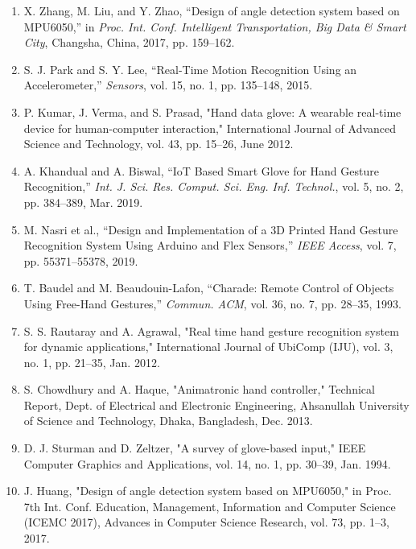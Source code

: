 \begin{enumerate}
  \item X. Zhang, M. Liu, and Y. Zhao, “Design of angle detection system based on MPU6050,” in \textit{Proc. Int. Conf. Intelligent Transportation, Big Data \& Smart City}, Changsha, China, 2017, pp. 159–162.
  \item S. J. Park and S. Y. Lee, “Real-Time Motion Recognition Using an Accelerometer,” \textit{Sensors}, vol. 15, no. 1, pp. 135–148, 2015.
  \item P. Kumar, J. Verma, and S. Prasad, "Hand data glove: A wearable real-time device for human-computer interaction," International Journal of Advanced Science and Technology, vol. 43, pp. 15–26, June 2012. 
  \item A. Khandual and A. Biswal, “IoT Based Smart Glove for Hand Gesture Recognition,” \textit{Int. J. Sci. Res. Comput. Sci. Eng. Inf. Technol.}, vol. 5, no. 2, pp. 384–389, Mar. 2019.
  \item M. Nasri et al., “Design and Implementation of a 3D Printed Hand Gesture Recognition System Using Arduino and Flex Sensors,” \textit{IEEE Access}, vol. 7, pp. 55371–55378, 2019.
  \item T. Baudel and M. Beaudouin-Lafon, “Charade: Remote Control of Objects Using Free-Hand Gestures,” \textit{Commun. ACM}, vol. 36, no. 7, pp. 28–35, 1993.
  \item S. S. Rautaray and A. Agrawal, "Real time hand gesture recognition system for dynamic applications," International Journal of UbiComp (IJU), vol. 3, no. 1, pp. 21–35, Jan. 2012.
  \item S. Chowdhury and A. Haque, "Animatronic hand controller," Technical Report, Dept. of Electrical and Electronic Engineering, Ahsanullah University of Science and Technology, Dhaka, Bangladesh, Dec. 2013.
  \item D. J. Sturman and D. Zeltzer, "A survey of glove-based input," IEEE Computer Graphics and Applications, vol. 14, no. 1, pp. 30–39, Jan. 1994.
  \item J. Huang, "Design of angle detection system based on MPU6050," in Proc. 7th Int. Conf. Education, Management, Information and Computer Science (ICEMC 2017), Advances in Computer Science Research, vol. 73, pp. 1–3, 2017.
\end{enumerate}